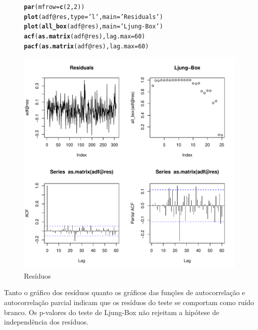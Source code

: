 \documentclass{article}\usepackage[]{graphicx}\usepackage[]{color}
\makeatletter
\def\maxwidth{ %
  \ifdim\Gin@nat@width>\linewidth
    \linewidth
  \else
    \Gin@nat@width
  \fi
}
\newcommand{\hlnum}[1]{\textcolor[rgb]{0.686,0.059,0.569}{#1}}%
\newcommand{\hlstr}[1]{\textcolor[rgb]{0.192,0.494,0.8}{#1}}%
\newcommand{\hlopt}[1]{\textcolor[rgb]{0,0,0}{#1}}%
\newcommand{\hlstd}[1]{\textcolor[rgb]{0.345,0.345,0.345}{#1}}%
\newcommand{\hlkwc}[1]{\textcolor[rgb]{0.333,0.667,0.333}{#1}}%
\newcommand{\hlkwd}[1]{\textcolor[rgb]{0.737,0.353,0.396}{\textbf{#1}}}%
\newenvironment{kframe}{%
 \def\at@end@of@kframe{}%
 \ifinner\ifhmode%
  \def\at@end@of@kframe{\end{minipage}}%
  \begin{minipage}{\columnwidth}%
 \fi\fi%
 \def\FrameCommand##1{\hskip\@totalleftmargin \hskip-\fboxsep
 \colorbox{shadecolor}{##1}\hskip-\fboxsep
     \hskip-\linewidth \hskip-\@totalleftmargin \hskip\columnwidth}%
 \MakeFramed {\advance\hsize-\width
   \@totalleftmargin\z@ \linewidth\hsize
   \@setminipage}}%
 {\par\unskip\endMakeFramed%
 \at@end@of@kframe}
\newenvironment{knitrout}{}{} %
\makeatother
\begin{document}
            \begin{figure}[H]
            \caption{Resíduos}
            \centering
\begin{knitrout}
\color{fgcolor}\begin{kframe}
\begin{alltt}
\hlkwd{par}\hlstd{(}\hlkwc{mfrow} \hlstd{=} \hlkwd{c}\hlstd{(}\hlnum{2}\hlstd{,}\hlnum{2}\hlstd{))}
\hlkwd{plot}\hlstd{(adf}\hlopt{@}\hlkwc{res}\hlstd{,} \hlkwc{type}\hlstd{=}\hlstr{'l'}\hlstd{,} \hlkwc{main}\hlstd{=}\hlstr{'Residuals'}\hlstd{)}
\hlkwd{plot}\hlstd{(}\hlkwd{all_box}\hlstd{(adf}\hlopt{@}\hlkwc{res}\hlstd{),} \hlkwc{main}\hlstd{=}\hlstr{'Ljung-Box'}\hlstd{)}
\hlkwd{acf}\hlstd{(}\hlkwd{as.matrix}\hlstd{(adf}\hlopt{@}\hlkwc{res}\hlstd{),} \hlkwc{lag.max}\hlstd{=}\hlnum{60}\hlstd{)}
\hlkwd{pacf}\hlstd{(}\hlkwd{as.matrix}\hlstd{(adf}\hlopt{@}\hlkwc{res}\hlstd{),} \hlkwc{lag.max}\hlstd{=}\hlnum{60}\hlstd{)}
\end{alltt}
\end{kframe}
\includegraphics[width=\maxwidth]{figure/unnamed-chunk-70-1} 

\end{knitrout}
            \end{figure}

            Tanto o gráfico dos resíduos quanto os gráficos das funções de autocorrelação e autocorrelação parcial indicam que os resíduos do teste se comportam como ruído branco. Os p-valores do teste de Ljung-Box não rejeitam a hipótese de independência dos resíduos.
            
\end{document}
